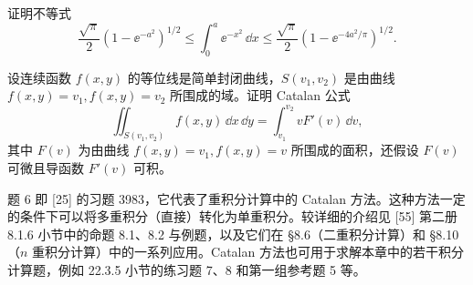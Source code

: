\begin{xreferenceproblem}[5]
证明不等式
  \[
    \frac{\sqrt\pi}{2}\left(1-\ee^{-a^2}\right)^{1/2}
    \le\int_0^a\ee^{-x^2}\,\dd x
    \le\frac{\sqrt\pi}{2}\left(1-\ee^{-4a^2/\pi}\right)^{1/2}.
  \]
\end{xreferenceproblem}

\begin{xreferenceproblem}[6]
设连续函数 $f(x,y)$ 的等位线是简单封闭曲线，$S(v_1,v_2)$ 是由曲线 $f(x,y)=v_1,f(x,y)=v_2$ 所围成的域。证明 Catalan 公式
  \[
    \iint_{S(v_1,v_2)}f(x,y)\,\dd x\,\dd y
    =\int_{v_1}^{v_2}vF'(v)\,\dd v,
  \]
  其中 $F(v)$ 为由曲线 $f(x,y)=v_1,f(x,y)=v$ 所围成的面积，还假设 $F(v)$ 可微且导函数 $F'(v)$ 可积。
\end{xreferenceproblem}

\begin{xremark}
题 6 即 [25] 的习题 3983，它代表了重积分计算中的 Catalan 方法。这种方法一定的条件下可以将多重积分（直接）转化为单重积分。较详细的介绍见 [55] 第二册 8.1.6 小节中的命题 8.1、8.2 与例题，以及它们在 §8.6（二重积分计算）和 §8.10（$n$ 重积分计算）中的一系列应用。Catalan 方法也可用于求解本章中的若干积分计算题，例如 22.3.5 小节的练习题 7、8 和第一组参考题 5 等。
\end{xremark}
